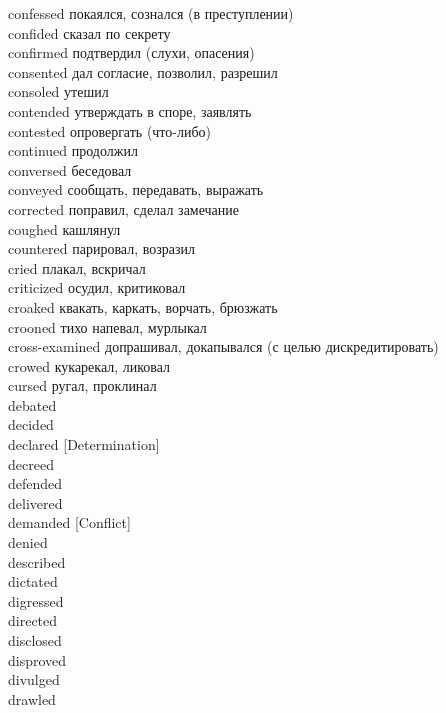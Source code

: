 confessed \hfill покаялся, сознался (в преступлении)\\
confided \hfill сказал по секрету\\
confirmed \hfill подтвердил (слухи, опасения)\\
consented \hfill дал согласие, позволил, разрешил\\
consoled \hfill утешил\\
contended \hfill утверждать в споре, заявлять\\
contested \hfill опровергать (что-либо)\\
continued \hfill продолжил\\
conversed \hfill беседовал\\
conveyed \hfill сообщать, передавать, выражать\\
corrected \hfill поправил, сделал замечание\\
coughed \hfill кашлянул\\
countered \hfill парировал, возразил\\
cried \hfill плакал, вскричал\\
criticized \hfill осудил, критиковал\\
croaked \hfill квакать, каркать, ворчать, брюзжать\\
crooned \hfill тихо напевал, мурлыкал\\
cross-examined \hfill допрашивал, докапывался (с целью дискредитировать)\\
crowed \hfill кукарекал, ликовал\\
cursed \hfill ругал, проклинал\\
debated \hfill \\
decided \hfill \\
declared [Determination] \hfill \\
decreed \hfill \\
defended \hfill \\
delivered \hfill \\
demanded [Conflict] \hfill \\
denied \hfill \\
described \hfill \\
dictated \hfill \\
digressed \hfill \\
directed \hfill \\
disclosed \hfill \\
disproved \hfill \\
divulged \hfill \\
drawled \hfill \\
